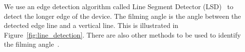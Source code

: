 We use an edge detection algorithm called Line Segment Detector (LSD)~\cite{grompone2010lsd} to detect the longer edge of the device.
The filming angle is the angle between the detected edge line and a vertical line. This is illustrated in Figure~\ref{fig:line_detection}.
There are also other methods to be used to identify the filming angle~\cite{Torralba:2002:DEI:628330.628820}.

%

